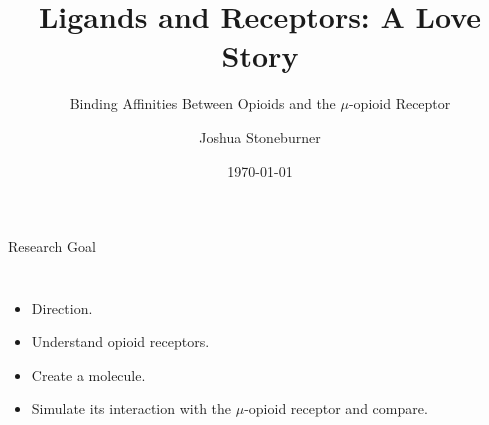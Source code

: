 \documentclass[aspectratio=169]{beamer}
\title{Ligands and Receptors: A Love Story}
\subtitle{Binding Affinities Between Opioids and the $\mu$-opioid Receptor}
\date{\today}
\author{Joshua Stoneburner}
\institute{\url{https://github.com/JoshuaKSt}}
\begin{document}
\maketitle

\begin{frame}{Research Goal}

    \begin{columns}
            \begin{itemize}
            \item Direction.
            \item Understand opioid receptors.
            \item Create a molecule. 
            \item Simulate its interaction with the $\mu$-opioid receptor and compare.
      \end{itemize}
    \end{columns}
    \end{frame}
\end{document}
